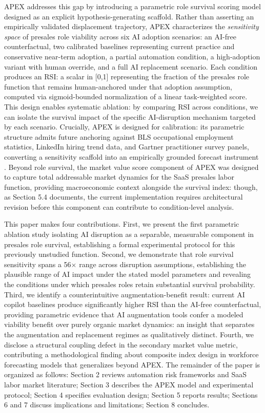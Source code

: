 \documentclass[10pt, conference]{IEEEtran}
\begin{document}
APEX addresses this gap by introducing a parametric role survival scoring model designed as an explicit hypothesis-generating scaffold. Rather than asserting an empirically validated displacement trajectory, APEX characterizes the \textit{sensitivity space} of presales role viability across six AI adoption scenarios: an AI-free counterfactual, two calibrated baselines representing current practice and conservative near-term adoption, a partial automation condition, a high-adoption variant with human override, and a full AI replacement scenario. Each condition produces an RSI: a scalar in [0,1] representing the fraction of the presales role function that remains human-anchored under that adoption assumption, computed via sigmoid-bounded normalization of a linear task-weighted score. This design enables systematic ablation: by comparing RSI across conditions, we can isolate the survival impact of the specific AI-disruption mechanism targeted by each scenario. Crucially, APEX is designed for calibration: its parametric structure admits future anchoring against BLS occupational employment statistics, LinkedIn hiring trend data, and Gartner practitioner survey panels, converting a sensitivity scaffold into an empirically grounded forecast instrument \cite{wiser2021expert}. Beyond role survival, the market value score component of APEX was designed to capture total addressable market dynamics for the SaaS presales labor function, providing macroeconomic context alongside the survival index: though, as Section 5.4 documents, the current implementation requires architectural revision before this component can contribute to condition-level analysis.

This paper makes four contributions. First, we present the first parametric ablation study isolating AI disruption as a separable, measurable component in presales role survival, establishing a formal experimental protocol for this previously unstudied function. Second, we demonstrate that role survival sensitivity spans a 56$\times$ range across disruption assumptions, establishing the plausible range of AI impact under the stated model parameters and revealing the conditions under which presales roles retain substantial survival probability. Third, we identify a counterintuitive augmentation-benefit result: current AI copilot baselines produce significantly higher RSI than the AI-free counterfactual, providing parametric evidence that AI augmentation tools confer a modeled viability benefit over purely organic market dynamics: an insight that separates the augmentation and replacement regimes as qualitatively distinct. Fourth, we disclose a structural coupling defect in the secondary market value metric, contributing a methodological finding about composite index design in workforce forecasting models that generalizes beyond APEX. The remainder of the paper is organized as follows: Section 2 reviews automation risk frameworks and SaaS labor market literature; Section 3 describes the APEX model and experimental protocol; Section 4 specifies evaluation design; Section 5 reports results; Sections 6 and 7 discuss implications and limitations; Section 8 concludes.
\end{document}
